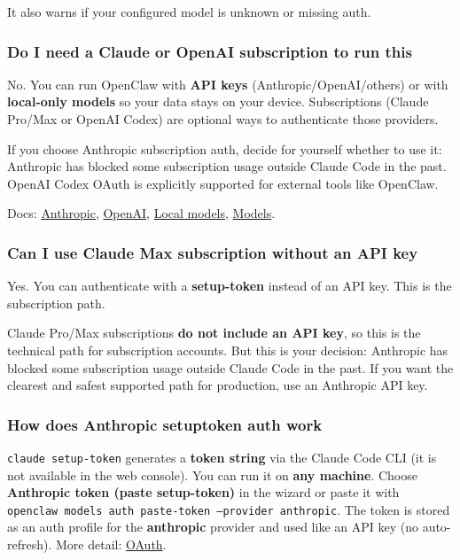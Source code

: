 It also warns if your configured model is unknown or missing auth.

\subsubsection{Do I need a Claude or OpenAI subscription to run this}


No. You can run OpenClaw with \textbf{API keys} (Anthropic/OpenAI/others) or with
\textbf{local-only models} so your data stays on your device. Subscriptions (Claude
Pro/Max or OpenAI Codex) are optional ways to authenticate those providers.

If you choose Anthropic subscription auth, decide for yourself whether to use it:
Anthropic has blocked some subscription usage outside Claude Code in the past.
OpenAI Codex OAuth is explicitly supported for external tools like OpenClaw.

Docs: \href{/providers/anthropic}{Anthropic}, \href{/providers/openai}{OpenAI},
\href{/gateway/local-models}{Local models}, \href{/concepts/models}{Models}.

\subsubsection{Can I use Claude Max subscription without an API key}


Yes. You can authenticate with a \textbf{setup-token}
instead of an API key. This is the subscription path.

Claude Pro/Max subscriptions \textbf{do not include an API key}, so this is the
technical path for subscription accounts. But this is your decision: Anthropic
has blocked some subscription usage outside Claude Code in the past.
If you want the clearest and safest supported path for production, use an Anthropic API key.

\subsubsection{How does Anthropic setuptoken auth work}


\texttt{claude setup-token} generates a \textbf{token string} via the Claude Code CLI (it is not available in the web console). You can run it on \textbf{any machine}. Choose \textbf{Anthropic token (paste setup-token)} in the wizard or paste it with \texttt{openclaw models auth paste-token --provider anthropic}. The token is stored as an auth profile for the \textbf{anthropic} provider and used like an API key (no auto-refresh). More detail: \href{/concepts/oauth}{OAuth}.

